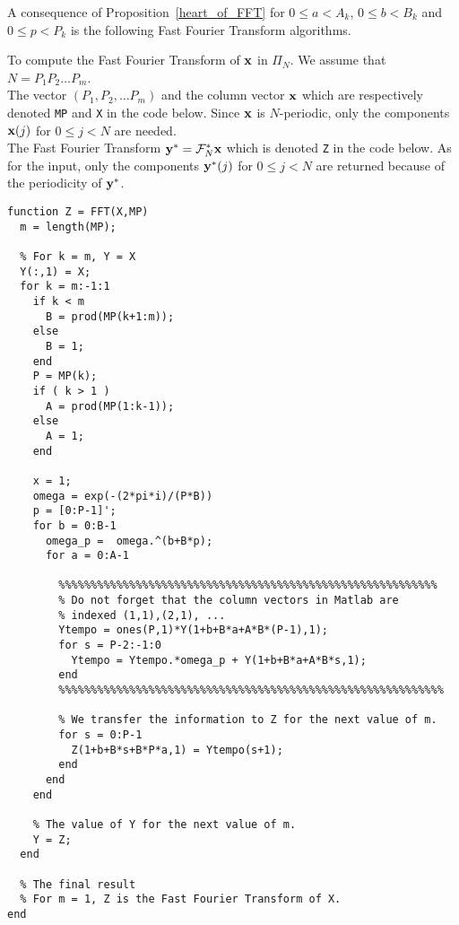 A consequence of Proposition~\ref{heart_of_FFT} for $0\leq a <A_k$,
$0\leq b < B_k$ and $0\leq p < P_k$ is the following
Fast Fourier Transform algorithms.

\begin{code}
To compute the Fast Fourier Transform of $\mathbf{x}$ in $\Pi_N$.  We
assume that $N = P_1 P_2 \ldots P_m$.\\
 The vector $(P_1,P_2, \ldots P_m)$ and the column vector
$\mathbf{x}$ which are respectively denoted \verb!MP! and \verb!X! in the
code below.  Since $\mathbf{x}$ is $N$-periodic, only the
components $\mathbf{x}(j)$ for $0 \leq j < N$ are needed.\\
 The Fast Fourier Transform
$\mathbf{y}^\ast= \mathcal{F}^\ast_N \mathbf{x}$ which is
denoted \verb!Z! in the code below.  As for the input, only the
components $\mathbf{y}^\ast(j)$ for $0 \leq j < N$ are returned
because of the periodicity of $\mathbf{y}^\ast$.
\small
\begin{verbatim}
function Z = FFT(X,MP)
  m = length(MP);

  % For k = m, Y = X
  Y(:,1) = X;
  for k = m:-1:1
    if k < m
      B = prod(MP(k+1:m));
    else 
      B = 1;
    end
    P = MP(k);
    if ( k > 1 )
      A = prod(MP(1:k-1));
    else
      A = 1;
    end

    x = 1;
    omega = exp(-(2*pi*i)/(P*B))
    p = [0:P-1]';
    for b = 0:B-1
      omega_p =  omega.^(b+B*p);
      for a = 0:A-1

        %%%%%%%%%%%%%%%%%%%%%%%%%%%%%%%%%%%%%%%%%%%%%%%%%%%%%%%%%%%
        % Do not forget that the column vectors in Matlab are
        % indexed (1,1),(2,1), ...
        Ytempo = ones(P,1)*Y(1+b+B*a+A*B*(P-1),1);
        for s = P-2:-1:0
          Ytempo = Ytempo.*omega_p + Y(1+b+B*a+A*B*s,1);
        end
        %%%%%%%%%%%%%%%%%%%%%%%%%%%%%%%%%%%%%%%%%%%%%%%%%%%%%%%%%%%%

        % We transfer the information to Z for the next value of m.
        for s = 0:P-1
          Z(1+b+B*s+B*P*a,1) = Ytempo(s+1);
        end
      end
    end

    % The value of Y for the next value of m.
    Y = Z;
  end

  % The final result
  % For m = 1, Z is the Fast Fourier Transform of X. 
end
\end{verbatim}
\end{code}

